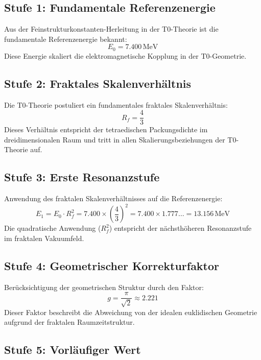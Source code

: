 	\subsection{Stufe 1: Fundamentale Referenzenergie}
	
	Aus der Feinstrukturkonstanten-Herleitung in der T0-Theorie ist die fundamentale Referenzenergie bekannt:
	\begin{equation}
		E_0 = 7.400\,\text{MeV}
	\end{equation}
	Diese Energie skaliert die elektromagnetische Kopplung in der T0-Geometrie.
	
	\subsection{Stufe 2: Fraktales Skalenverhältnis}
	
	Die T0-Theorie postuliert ein fundamentales fraktales Skalenverhältnis:
	\begin{equation}
		R_f = \frac{4}{3}
	\end{equation}
	Dieses Verhältnis entspricht der tetraedischen Packungsdichte im dreidimensionalen Raum und tritt in allen Skalierungsbeziehungen der T0-Theorie auf.
	
	\subsection{Stufe 3: Erste Resonanzstufe}
	
	Anwendung des fraktalen Skalenverhältnisses auf die Referenzenergie:
	\begin{equation}
		E_1 = E_0 \cdot R_f^2 = 7.400 \times \left(\frac{4}{3}\right)^2 = 7.400 \times 1.777\ldots = 13.156\,\text{MeV}
	\end{equation}
	Die quadratische Anwendung ($R_f^2$) entspricht der nächsthöheren Resonanzstufe im fraktalen Vakuumfeld.
	
	\subsection{Stufe 4: Geometrischer Korrekturfaktor}
	
	Berücksichtigung der geometrischen Struktur durch den Faktor:
	\begin{equation}
		g = \frac{\pi}{\sqrt{2}} \approx 2.221
	\end{equation}
	Dieser Faktor beschreibt die Abweichung von der idealen euklidischen Geometrie aufgrund der fraktalen Raumzeitstruktur.
	
	\subsection{Stufe 5: Vorläufiger Wert}
	
